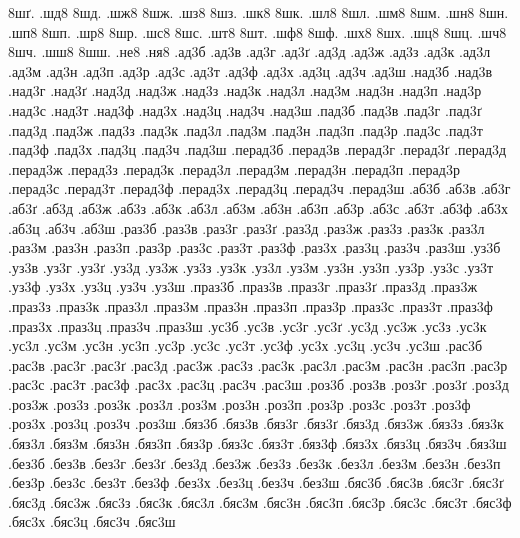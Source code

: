 {8шґ.
.шд8
8шд.
.шж8
8шж.
.шз8
8шз.
.шк8
8шк.
.шл8
8шл.
.шм8
8шм.
.шн8
8шн.
.шп8
8шп.
.шр8
8шр.
.шс8
8шс.
.шт8
8шт.
.шф8
8шф.
.шх8
8шх.
.шц8
8шц.
.шч8
8шч.
.шш8
8шш.
.не8
.ня8
.ад3б
.ад3в
.ад3г
.ад3ґ
.ад3д
.ад3ж
.ад3з
.ад3к
.ад3л
.ад3м
.ад3н
.ад3п
.ад3р
.ад3с
.ад3т
.ад3ф
.ад3х
.ад3ц
.ад3ч
.ад3ш
.над3б
.над3в
.над3г
.над3ґ
.над3д
.над3ж
.над3з
.над3к
.над3л
.над3м
.над3н
.над3п
.над3р
.над3с
.над3т
.над3ф
.над3х
.над3ц
.над3ч
.над3ш
.пад3б
.пад3в
.пад3г
.пад3ґ
.пад3д
.пад3ж
.пад3з
.пад3к
.пад3л
.пад3м
.пад3н
.пад3п
.пад3р
.пад3с
.пад3т
.пад3ф
.пад3х
.пад3ц
.пад3ч
.пад3ш
.перад3б
.перад3в
.перад3г
.перад3ґ
.перад3д
.перад3ж
.перад3з
.перад3к
.перад3л
.перад3м
.перад3н
.перад3п
.перад3р
.перад3с
.перад3т
.перад3ф
.перад3х
.перад3ц
.перад3ч
.перад3ш
.аб3б
.аб3в
.аб3г
.аб3ґ
.аб3д
.аб3ж
.аб3з
.аб3к
.аб3л
.аб3м
.аб3н
.аб3п
.аб3р
.аб3с
.аб3т
.аб3ф
.аб3х
.аб3ц
.аб3ч
.аб3ш
.раз3б
.раз3в
.раз3г
.раз3ґ
.раз3д
.раз3ж
.раз3з
.раз3к
.раз3л
.раз3м
.раз3н
.раз3п
.раз3р
.раз3с
.раз3т
.раз3ф
.раз3х
.раз3ц
.раз3ч
.раз3ш
.уз3б
.уз3в
.уз3г
.уз3ґ
.уз3д
.уз3ж
.уз3з
.уз3к
.уз3л
.уз3м
.уз3н
.уз3п
.уз3р
.уз3с
.уз3т
.уз3ф
.уз3х
.уз3ц
.уз3ч
.уз3ш
.праз3б
.праз3в
.праз3г
.праз3ґ
.праз3д
.праз3ж
.праз3з
.праз3к
.праз3л
.праз3м
.праз3н
.праз3п
.праз3р
.праз3с
.праз3т
.праз3ф
.праз3х
.праз3ц
.праз3ч
.праз3ш
.ус3б
.ус3в
.ус3г
.ус3ґ
.ус3д
.ус3ж
.ус3з
.ус3к
.ус3л
.ус3м
.ус3н
.ус3п
.ус3р
.ус3с
.ус3т
.ус3ф
.ус3х
.ус3ц
.ус3ч
.ус3ш
.рас3б
.рас3в
.рас3г
.рас3ґ
.рас3д
.рас3ж
.рас3з
.рас3к
.рас3л
.рас3м
.рас3н
.рас3п
.рас3р
.рас3с
.рас3т
.рас3ф
.рас3х
.рас3ц
.рас3ч
.рас3ш
.роз3б
.роз3в
.роз3г
.роз3ґ
.роз3д
.роз3ж
.роз3з
.роз3к
.роз3л
.роз3м
.роз3н
.роз3п
.роз3р
.роз3с
.роз3т
.роз3ф
.роз3х
.роз3ц
.роз3ч
.роз3ш
.бяз3б
.бяз3в
.бяз3г
.бяз3ґ
.бяз3д
.бяз3ж
.бяз3з
.бяз3к
.бяз3л
.бяз3м
.бяз3н
.бяз3п
.бяз3р
.бяз3с
.бяз3т
.бяз3ф
.бяз3х
.бяз3ц
.бяз3ч
.бяз3ш
.без3б
.без3в
.без3г
.без3ґ
.без3д
.без3ж
.без3з
.без3к
.без3л
.без3м
.без3н
.без3п
.без3р
.без3с
.без3т
.без3ф
.без3х
.без3ц
.без3ч
.без3ш
.бяс3б
.бяс3в
.бяс3г
.бяс3ґ
.бяс3д
.бяс3ж
.бяс3з
.бяс3к
.бяс3л
.бяс3м
.бяс3н
.бяс3п
.бяс3р
.бяс3с
.бяс3т
.бяс3ф
.бяс3х
.бяс3ц
.бяс3ч
.бяс3ш
}
